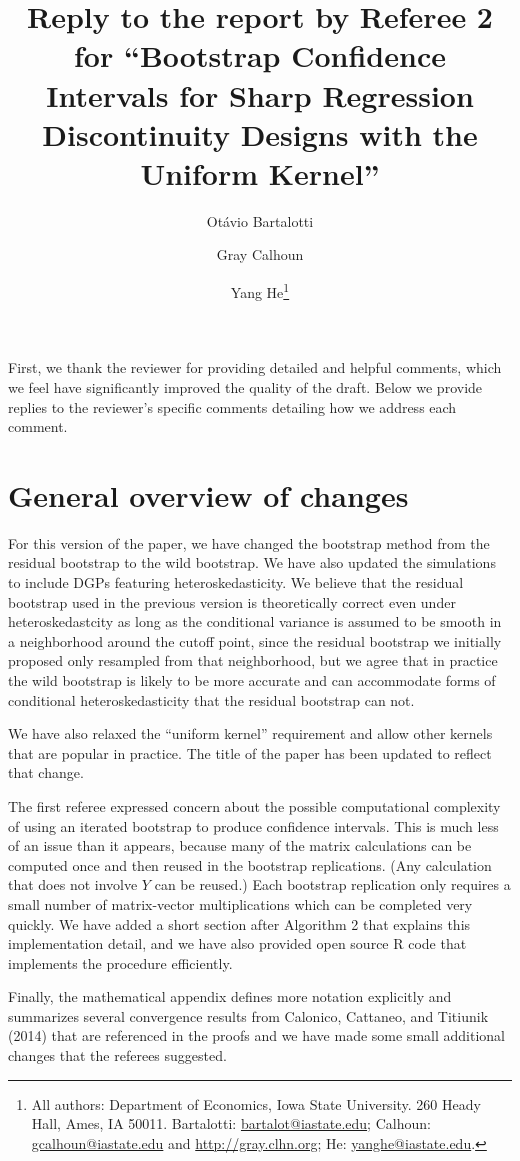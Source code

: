 \documentclass[12pt,fleqn]{article}
\title{Reply to the report by Referee 2 for ``Bootstrap Confidence Intervals for Sharp Regression Discontinuity Designs
  with the Uniform Kernel''}
\author{Ot\'avio Bartalotti \and Gray Calhoun \and Yang He\thanks{%
  All authors: Department of Economics, Iowa State University.
  260 Heady Hall, Ames, IA 50011.
  Bartalotti: \protect\url{bartalot@iastate.edu};
  Calhoun: \protect\url{gcalhoun@iastate.edu} and
  \protect\url{http://gray.clhn.org};
  He: \protect\url{yanghe@iastate.edu}.}}
\begin{document}
\maketitle

First, we thank the reviewer for providing detailed and helpful comments, which
we feel have significantly improved the quality of the draft.  Below we provide
replies to the reviewer's specific comments detailing how we address each
comment.

\section{General overview of changes}

For this version of the paper, we have changed the bootstrap method from the
residual bootstrap to the wild bootstrap. We have also updated the simulations
to include DGPs featuring heteroskedasticity. We believe that the residual
bootstrap used in the previous version is theoretically correct even under
heteroskedastcity as long as the conditional variance is assumed to be smooth in
a neighborhood around the cutoff point, since the residual bootstrap we initially
proposed only resampled from that neighborhood, but we agree that in practice
the wild bootstrap is likely to be more accurate and can accommodate forms of
conditional heteroskedasticity that the residual bootstrap can not.

We have also relaxed the ``uniform kernel'' requirement and allow other kernels
that are popular in practice. The title of the paper has been updated to reflect
that change.

The first referee expressed concern about the possible computational complexity of
using an iterated bootstrap to produce confidence intervals. This is much less
of an issue than it appears, because many of the matrix calculations can be
computed once and then reused in the bootstrap replications. (Any calculation
that does not involve $Y$ can be reused.) Each bootstrap replication only
requires a small number of matrix-vector multiplications which can be completed
very quickly. We have added a short section after Algorithm 2 that explains
this implementation detail, and we have also provided open source R code that
implements the procedure efficiently.

Finally, the mathematical appendix defines more notation explicitly and
summarizes several convergence results from Calonico, Cattaneo, and Titiunik
(2014) that are referenced in the proofs and we have made some small additional
changes that the referees suggested.
\end{document}
